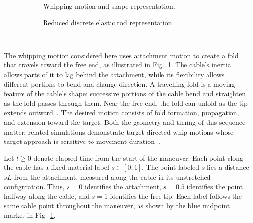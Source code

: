 \documentclass[letterpaper, 10 pt, conference]{ieeeconf}
\begin{document}
%         


\begin{figure}[t]
    \centering

    \begin{subfigure}[t]{0.495\textwidth}
        \centering
        \resizebox{\linewidth}{!}{%
            
        }
        \caption{Whipping motion and shape representation.}
        \label{fig:problem_whipping}
    \end{subfigure}
    \hfill
    \begin{subfigure}[t]{0.495\textwidth}
        \centering
        \resizebox{\linewidth}{!}{%
            
        }
        \caption{Reduced discrete elastic rod representation.}
        \label{fig:problem_dder}
    \end{subfigure}

    \caption{...}
    \label{fig:problem_statement}
\end{figure}




The whipping motion considered here uses attachment motion to
create a fold that travels toward the free end, as illustrated
in Fig.~\ref{fig:problem_whipping}. The cable's inertia allows
parts of it to lag behind the attachment, while its flexibility
allows different portions to bend and change direction.
A travelling fold is a moving feature of the cable's shape:
successive portions of the cable bend and straighten as the
fold passes through them. Near the free end, the fold can
unfold as the tip extends outward~\cite{MCMILLEN2003192}.
The desired motion consists of fold formation, propagation,
and extension toward the target. Both the geometry and timing
of this sequence matter; related simulations demonstrate
target-directed whip motions whose target approach is sensitive
to movement duration~\cite{nah2023learning}.

Let $t\geq0$ denote elapsed time from the start of the maneuver.
Each point along the cable has a fixed material label
$s\in[0,1]$. The point labeled $s$ lies a distance $sL$ from
the attachment, measured along the cable in its unstretched
configuration. Thus, $s=0$ identifies the attachment, $s=0.5$
identifies the point halfway along the cable, and $s=1$
identifies the free tip. Each label follows the same cable
point throughout the maneuver, as shown by the blue midpoint
marker in Fig.~\ref{fig:problem_whipping}.
\end{document}
